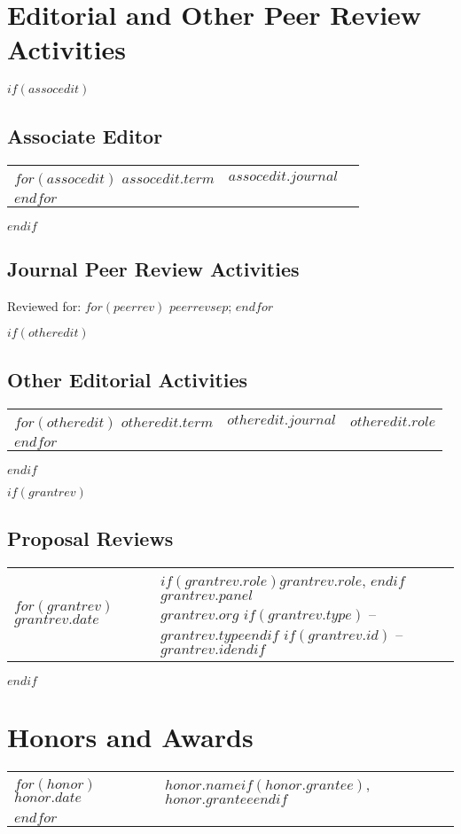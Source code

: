 \documentclass[12pt, martgin, line]{article}
\begin{document}
\section*{Editorial and Other Peer Review Activities}

$if(assocedit)$
\subsection*{Associate Editor}
\begin{tabular}{lll}
$for(assocedit)$
$assocedit.term$&
$assocedit.journal$
\\
$endfor$
\end{tabular}
$endif$

\subsection*{Journal Peer Review Activities}
Reviewed for:
$for(peerrev)$
$peerrev$$sep$;
$endfor$

$if(otheredit)$
\subsection*{Other Editorial Activities}
\begin{tabular}{lll}
$for(otheredit)$
$otheredit.term$&
$otheredit.journal$&
$otheredit.role$
\\
$endfor$
\end{tabular}
$endif$

$if(grantrev)$
\subsection*{Proposal Reviews}
\setlength{\extrarowheight}{.75em}
\begin{tabular}{lp{5.5in}}   
$for(grantrev)$
$grantrev.date$&
\parbox[t]{5.5in}{
  $if(grantrev.role)$$grantrev.role$, $endif$ 
  $grantrev.panel$\\
  \textit{$grantrev.org$}
  $if(grantrev.type)$ -- \textit{$grantrev.type$}$endif$
  $if(grantrev.id)$ -- \textit{$grantrev.id$}$endif$
  }\\
$endfor$
\end{tabular}
\setlength{\extrarowheight}{0em}
$endif$


\section*{Honors and Awards}
\begin{tabular}{lp{5.5in}}
$for(honor)$
$honor.date$&
$honor.name$$if(honor.grantee)$, $honor.grantee$$endif$
\\
$endfor$
\end{tabular}
\end{document}
